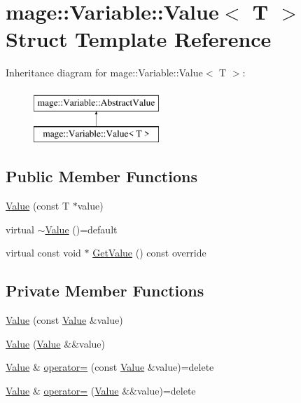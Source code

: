 \hypertarget{structmage_1_1_variable_1_1_value}{}\section{mage\+:\+:Variable\+:\+:Value$<$ T $>$ Struct Template Reference}
\label{structmage_1_1_variable_1_1_value}
Inheritance diagram for mage\+:\+:Variable\+:\+:Value$<$ T $>$\+:\begin{figure}[H]
\begin{center}
\leavevmode
\includegraphics[height=2.000000cm]{structmage_1_1_variable_1_1_value}
\end{center}
\end{figure}
\subsection*{Public Member Functions}
\begin{DoxyCompactItemize}
\item 
\hyperlink{structmage_1_1_variable_1_1_value_a1e29cc5eaeb8356a11a1eca0232cf162}{Value} (const T $\ast$value)
\item 
virtual \hyperlink{structmage_1_1_variable_1_1_value_ab77eb80d4786a060778dc41ee73c1371}{$\sim$\+Value} ()=default
\item 
virtual const void $\ast$ \hyperlink{structmage_1_1_variable_1_1_value_a04d70496ebb7ad71dafa3df877daeb26}{Get\+Value} () const override
\end{DoxyCompactItemize}
\subsection*{Private Member Functions}
\begin{DoxyCompactItemize}
\item 
\hyperlink{structmage_1_1_variable_1_1_value_a083583e9c9c59eae659db2bfdf4b6629}{Value} (const \hyperlink{structmage_1_1_variable_1_1_value}{Value} \&value)
\item 
\hyperlink{structmage_1_1_variable_1_1_value_a5c6f523b3fbd8547b18420de9a0b372e}{Value} (\hyperlink{structmage_1_1_variable_1_1_value}{Value} \&\&value)
\item 
\hyperlink{structmage_1_1_variable_1_1_value}{Value} \& \hyperlink{structmage_1_1_variable_1_1_value_a19c45282edac9ffaa0f687b7dd414392}{operator=} (const \hyperlink{structmage_1_1_variable_1_1_value}{Value} \&value)=delete
\item 
\hyperlink{structmage_1_1_variable_1_1_value}{Value} \& \hyperlink{structmage_1_1_variable_1_1_value_a2185d5eeb8f321a7e4f6d97463af4987}{operator=} (\hyperlink{structmage_1_1_variable_1_1_value}{Value} \&\&value)=delete
\end{DoxyCompactItemize}
